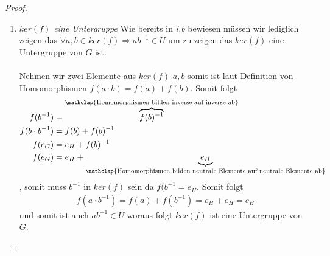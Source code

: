 \documentclass{../problemset}
\begin{document}
\begin{problem}
\begin{proof}
\begin{enumerate}
\begin{enumerate}[label=\alph*)]
		      \end{enumerate}
		\item \textit{$ker(f)$ eine Untergruppe}
		      Wie bereits in \textit{i.b} bewiesen müssen wir lediglich zeigen das $\forall a,b \in ker(f) \Rightarrow ab^{-1} \in U$ um zu zeigen das $ker(f)$ eine Untergruppe von $G$ ist.
		      \\\\
		      Nehmen wir zwei Elemente aus $ker(f)$ $a,b$ somit ist laut Definition von Homomorphismen $f(a \cdot b) = f(a) + f(b)$.
		      Somit folgt \begin{align}
			      f(b^{-1})         & = \overbrace{f(b)^{-1}}^{\mathclap{\text{Homomorphismen bilden inverse auf inverse ab}}}                      \\
			      f(b \cdot b^{-1}) & = f(b) + f(b)^{-1}                                                                                            \\
			      f(e_G)            & = e_H + f(b)^{-1}                                                                                             \\
			      f(e_G)            & = e_H + \underbrace{e_H}_{\mathclap{\text{Homomorphismen bilden neutrale Elemente auf neutrale Elemente ab}}}
		      \end{align}, somit muss $b^{-1}$ in $ker(f)$ sein da $f(b^{-1} = e_H$.
		      Somit folgt \begin{align}
			      f(a \cdot b^{-1}) = f(a) + f(b^{-1}) = e_H + e_H = e_H
		      \end{align} und somit ist auch $ab^{-1} \in U$ woraus folgt $ker(f)$ ist eine Untergruppe von $G$.
	\end{enumerate}
\end{proof}


\end{problem}
\end{document}
